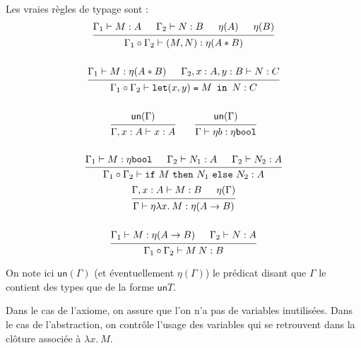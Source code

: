 \documentclass[./main]{subfiles}
\begin{document}
  Les vraies règles de typage sont :
  \begin{gather*}
    \begin{prooftree}
      \hypo{\Gamma_1 \vdash M : A}
      \hypo{\Gamma_2 \vdash N : B}
      \hypo{\eta(A)}
      \hypo{\eta(B)}
      \infer 4{\Gamma_1 \circ \Gamma_2 \vdash (M, N) : \eta (A * B)}
    \end{prooftree}\\[\baselineskip]
    \begin{prooftree}
      \hypo{\Gamma_1 \vdash M : \eta (A * B)}
      \hypo{\Gamma_2, x : A, y : B \vdash N : C}
      \infer 2{\Gamma_1 \circ \Gamma_2 \vdash \letin {(x,y)} M N : C}
    \end{prooftree}\\[\baselineskip]
    \begin{prooftree}
      \hypo{\mathsf{un}(\Gamma)}
      \infer 1{\Gamma, x : A \vdash x : A}
    \end{prooftree} \quad\quad
    \begin{prooftree}
      \hypo{\mathsf{un}(\Gamma)}
      \infer 1{\Gamma \vdash \eta b : \eta \mathtt{bool}}
    \end{prooftree}\\[\baselineskip]
    \begin{prooftree}
      \hypo{\Gamma_1 \vdash M : \eta \mathtt{bool}}
      \hypo{\Gamma_2 \vdash N_1 : A}
      \hypo{\Gamma_2 \vdash N_2 : A}
      \infer 3{\Gamma_1 \circ \Gamma_2 \vdash \ifte M {N_1} {N_2} : A}
    \end{prooftree}
  \end{gather*}
  \begin{gather*}
    \begin{prooftree}
      \hypo{\Gamma, x : A \vdash M : B}
      \hypo{\eta(\Gamma)}
      \infer 2{\Gamma \vdash \eta \lambda x. \: M : \eta(A \to B)}
    \end{prooftree}\\[\baselineskip]
    \begin{prooftree}
      \hypo{\Gamma_1 \vdash M : \eta (A \to B)}
      \hypo{\Gamma_2 \vdash N : A}
      \infer 2{\Gamma_1 \circ \Gamma_2 \vdash M \: N : B}
    \end{prooftree}
  \end{gather*}

  On note ici $\mathsf{un}(\Gamma)$ (et éventuellement $\eta(\Gamma)$) le prédicat disant que $\Gamma$ le contient des types que de la forme $\mathsf{un} T$.

  Dans le cas de l'axiome, on assure que l'on n'a pas de variables inutilisées.
  Dans le cas de l'abstraction, on contrôle l'usage des variables qui se retrouvent dans la clôture associée à $\lambda x. \: M$.
\end{document}
